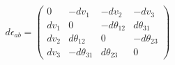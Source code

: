 \begin{equation} \label{l81-16}
d\epsilon _{ab}=
\left(\begin{array}{cccc}
 0 & -dv _1& -dv_2& -dv _3\\
dv_1& 0 & -d\theta _{12} & d\theta _{31}\\
d v_2 & d\theta _{12} & 0 & -d\theta _{23}\\
dv_3 &-d\theta _{31} & d\theta _{23} & 0 \end{array} \right )
\end{equation}

